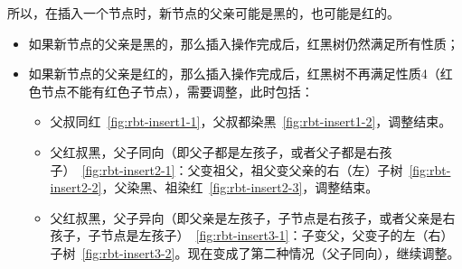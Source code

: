 所以，在插入一个节点时，新节点的父亲可能是黑的，也可能是红的。
\begin{itemize}
    \item 如果新节点的父亲是黑的，那么插入操作完成后，红黑树仍然满足所有性质；
    \item 如果新节点的父亲是红的，那么插入操作完成后，红黑树不再满足性质4（红色节点不能有红色子节点），需要调整，此时包括：
    \begin{itemize}
        \item 父叔同红~\cref{fig:rbt-insert1-1}，父叔都染黑~\cref{fig:rbt-insert1-2}，调整结束。
        \item 父红叔黑，父子同向（即父子都是左孩子，或者父子都是右孩子）~\cref{fig:rbt-insert2-1}：父变祖父，祖父变父亲的右（左）子树~\cref{fig:rbt-insert2-2}，父染黑、祖染红~\cref{fig:rbt-insert2-3}，调整结束。
        \item 父红叔黑，父子异向（即父亲是左孩子，子节点是右孩子，或者父亲是右孩子，子节点是左孩子）~\cref{fig:rbt-insert3-1}：子变父，父变子的左（右）子树~\cref{fig:rbt-insert3-2}。现在变成了第二种情况（父子同向），继续调整。
    \end{itemize}
\end{itemize}

